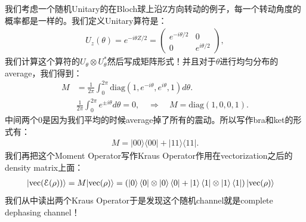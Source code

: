 \bigskip
{}

我们考虑一个随机Unitary的在Bloch球上沿Z方向转动的例子，每一个转动角度的概率都是一样的。我们定义Unitary算符是：
\begin{align}
  U_z(\theta)=e^{-i\theta Z/2}=\begin{pmatrix}e^{-i\theta/2}&0\\0&e^{i\theta/2}\end{pmatrix},
\end{align}
我们计算这个算符的$ U_\theta \otimes U_\theta^* $然后写成矩阵形式！并且对于$ \theta $进行均匀分布的average，我们得到：
\begin{align}
  M&=\frac{1}{2\pi}\int_{0}^{2\pi}\mathrm{diag}{\left(1,e^{-i\theta},e^{i\theta},1\right)}d\theta.\\
&\frac{1}{2\pi}\int_{0}^{2\pi}e^{\pm i\theta}d\theta=0,\quad \Rightarrow \quad M=\mathrm{diag}{\left(1,0,0,1\right)}.
\end{align}
中间两个0是因为我们平均的时候average掉了所有的震动。所以写作bra和ket的形式有：
\begin{align}
  M=|00\rangle\langle 00|+|11\rangle\langle 11|.
\end{align}
我们再把这个Moment Operator写作Kraus Operator作用在vectorization之后的density matrix上面：
\begin{align}
  |\mathrm{vec}(\mathcal{E}(\rho))\rangle&=M|\mathrm{vec}(\rho)\rangle=\left(\left| 0 \right\rangle\left\langle 0 \right|\otimes\left| 0 \right\rangle\left\langle 0 \right|+ \left| 1 \right\rangle\left\langle 1 \right|\otimes\left| 1 \right\rangle\left\langle 1 \right|\right)|\mathrm{vec}(\rho)\rangle
\end{align}
我们从中读出两个Kraus Operator于是发现这个随机channel就是complete dephasing channel！

\bigskip
{}

